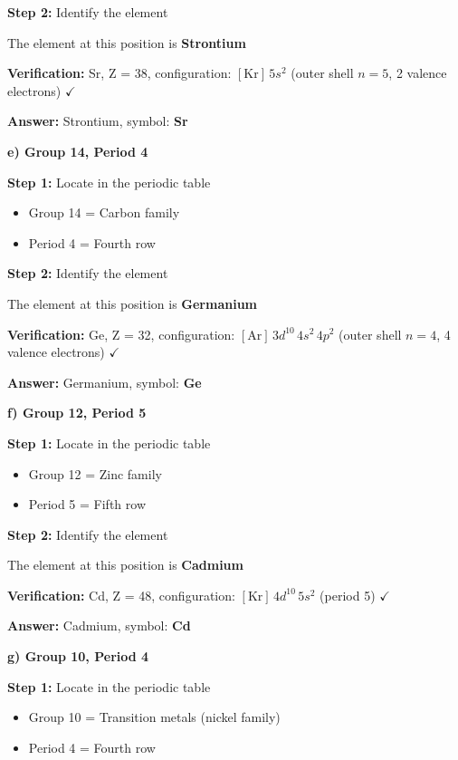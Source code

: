 \begin{exercise}
\begin{solu}
        \textbf{Step 2:} Identify the element

        The element at this position is \textbf{Strontium}

        \textbf{Verification:} Sr, Z = 38, configuration: \([\text{Kr}] \, 5s^2\) (outer shell \(n = 5\), 2 valence electrons) \(\checkmark\)

        \textbf{Answer:} Strontium, symbol: \textbf{Sr}

        \textbf{e) Group 14, Period 4}

        \textbf{Step 1:} Locate in the periodic table
        \begin{itemize}
            \item Group 14 = Carbon family
            \item Period 4 = Fourth row
        \end{itemize}

        \textbf{Step 2:} Identify the element

        The element at this position is \textbf{Germanium}

        \textbf{Verification:} Ge, Z = 32, configuration: \([\text{Ar}] \, 3d^{10} \, 4s^2 \, 4p^2\) (outer shell \(n = 4\), 4 valence electrons) \(\checkmark\)

        \textbf{Answer:} Germanium, symbol: \textbf{Ge}

        \textbf{f) Group 12, Period 5}

        \textbf{Step 1:} Locate in the periodic table
        \begin{itemize}
            \item Group 12 = Zinc family
            \item Period 5 = Fifth row
        \end{itemize}

        \textbf{Step 2:} Identify the element

        The element at this position is \textbf{Cadmium}

        \textbf{Verification:} Cd, Z = 48, configuration: \([\text{Kr}] \, 4d^{10} \, 5s^2\) (period 5) \(\checkmark\)

        \textbf{Answer:} Cadmium, symbol: \textbf{Cd}

        \textbf{g) Group 10, Period 4}

        \textbf{Step 1:} Locate in the periodic table
        \begin{itemize}
            \item Group 10 = Transition metals (nickel family)
            \item Period 4 = Fourth row
        \end{itemize}


\end{solu}
\end{exercise}
